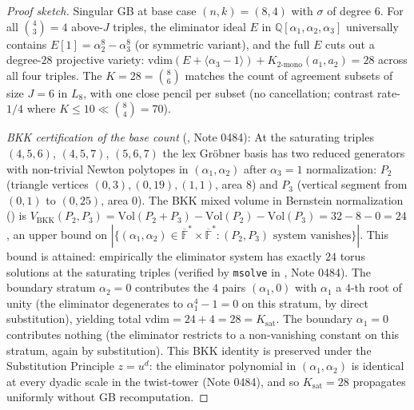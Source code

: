 \documentclass[11pt]{article}
\theoremstyle{definition}
\theoremstyle{remark}
\newcommand{\FF}{\mathbb{F}}
\begin{document}
\begin{proof}[Proof sketch]
Singular GB at base case $(n, k) = (8, 4)$ with $\sigma$ of degree $6$.
For all $\binom{4}{3} = 4$ above-$J$ triples, the eliminator ideal $E$ in
$\mathbb Q[\alpha_1, \alpha_2, \alpha_3]$ universally contains
$E[1] = \alpha_2^8 - \alpha_3^8$ (or symmetric variant), and the full $E$
cuts out a degree-$28$ projective variety:
$\mathrm{vdim}(E + \langle \alpha_3 - 1 \rangle) + K_{2\text{-mono}}(a_1, a_2)
= 28$ across all four triples. The $K = 28 = \binom{8}{6}$ matches the
count of agreement subsets of size $J = 6$ in $L_8$, with one close pencil
per subset (no cancellation; contrast rate-$1/4$ where $K \leq 10 \ll
\binom{8}{4} = 70$).

\emph{BKK certification of the base count}
(\cite{Bernstein1975, Khovanskii1991, CompanionRepo}, Note 0484):
At the saturating triples $(4, 5, 6)$, $(4, 5, 7)$, $(5, 6, 7)$ the
lex Gröbner basis has two reduced generators with non-trivial Newton
polytopes in $(\alpha_1, \alpha_2)$ after $\alpha_3 = 1$ normalization:
$P_2$ (triangle vertices $(0, 3), (0, 19), (1, 1)$, area $8$) and
$P_3$ (vertical segment from $(0, 1)$ to $(0, 25)$, area $0$). The
BKK mixed volume in Bernstein normalization (\cite{Bernstein1975}) is
$V_{\mathrm{BKK}}(P_2, P_3) = \mathrm{Vol}(P_2 + P_3) -
\mathrm{Vol}(P_2) - \mathrm{Vol}(P_3) = 32 - 8 - 0 = 24$, an upper bound
on $|\{(\alpha_1, \alpha_2) \in \overline{\FF}^* \times
\overline{\FF}^* : (P_2, P_3) \text{ system vanishes}\}|$. This bound
is attained: empirically the eliminator system has exactly $24$
torus solutions at the saturating triples (verified by \texttt{msolve}
in \cite{CompanionRepo}, Note 0484). The boundary stratum $\alpha_2 = 0$
contributes the $4$ pairs $(\alpha_1, 0)$ with $\alpha_1$ a $4$-th
root of unity (the eliminator degenerates to $\alpha_1^4 - 1 = 0$ on
this stratum, by direct substitution), yielding total
$\mathrm{vdim} = 24 + 4 = 28 = K_{\mathrm{sat}}$. The boundary
$\alpha_1 = 0$ contributes nothing (the eliminator restricts to a
non-vanishing constant on this stratum, again by substitution). This
BKK identity is preserved under the Substitution Principle $z = u^d$:
the eliminator polynomial in $(\alpha_1, \alpha_2)$ is identical at
every dyadic scale in the twist-tower (Note 0484), and so
$K_{\mathrm{sat}} = 28$ propagates uniformly without GB recomputation.


\end{proof}
\end{document}

